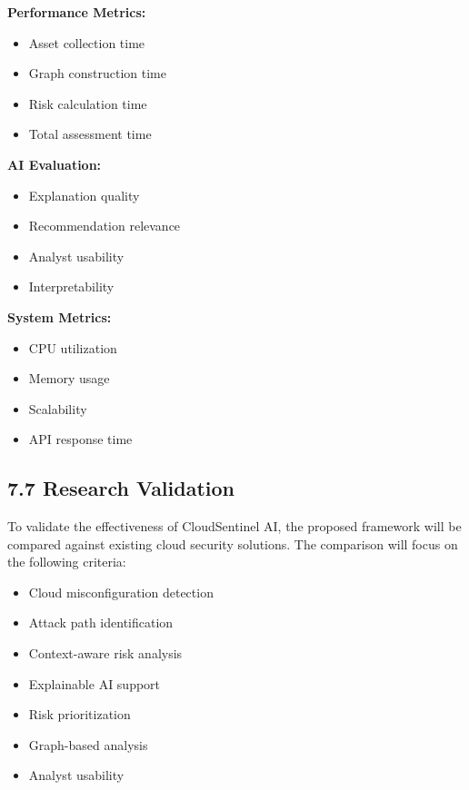 \textbf{Performance Metrics:}

\begin{itemize}
\tightlist
\item
  Asset collection time\\
\item
  Graph construction time\\
\item
  Risk calculation time\\
\item
  Total assessment time
\end{itemize}

\textbf{AI Evaluation:}

\begin{itemize}
\tightlist
\item
  Explanation quality\\
\item
  Recommendation relevance\\
\item
  Analyst usability\\
\item
  Interpretability
\end{itemize}

\textbf{System Metrics:}

\begin{itemize}
\tightlist
\item
  CPU utilization\\
\item
  Memory usage\\
\item
  Scalability\\
\item
  API response time
\end{itemize}

\subsection{7.7 Research Validation}

To validate the effectiveness of CloudSentinel AI, the proposed framework will be compared against existing cloud security solutions. The comparison will focus on the following criteria:

\begin{itemize}
\tightlist
\item
  Cloud misconfiguration detection\\
\item
  Attack path identification\\
\item
  Context-aware risk analysis\\
\item
  Explainable AI support\\
\item
  Risk prioritization\\
\item
  Graph-based analysis\\
\item
  Analyst usability
\end{itemize}

